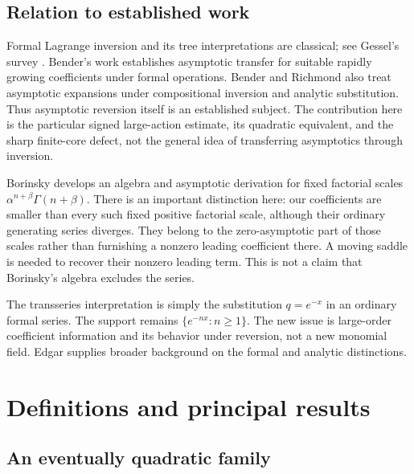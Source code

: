 \documentclass[11pt,a4paper]{article}
\numberwithin{equation}{section}
\theoremstyle{definition}
\theoremstyle{remark}
\begin{document}
\subsection{Relation to established work}

Formal Lagrange inversion and its tree interpretations are classical; see
Gessel's survey \cite{gessel}. Bender's work \cite{bender} establishes
asymptotic transfer for suitable rapidly growing coefficients under formal
operations. Bender and Richmond \cite{bender-richmond} also treat asymptotic
expansions under compositional inversion and analytic substitution. Thus
asymptotic reversion itself is an established subject. The contribution here
is the particular signed large-action estimate, its quadratic equivalent,
and the sharp finite-core defect, not the general idea of transferring
asymptotics through inversion.

Borinsky \cite{borinsky} develops an algebra and asymptotic derivation for
fixed factorial scales $\alpha^{n+\beta}\Gamma(n+\beta)$. There is an
important distinction here: our coefficients are smaller than every such
fixed positive factorial scale, although their ordinary generating series
diverges. They belong to the zero-asymptotic part of those scales rather
than furnishing a nonzero leading coefficient there. A moving saddle is
needed to recover their nonzero leading term. This is not a claim that
Borinsky's algebra excludes the series.

The transseries interpretation is simply the substitution $q=e^{-x}$ in
an ordinary formal series. The support remains $\{e^{-nx}:n\ge1\}$.
The new issue is large-order coefficient information and its behavior under
reversion, not a new monomial field. Edgar \cite{edgar} supplies broader
background on the formal and analytic distinctions.

\section{Definitions and principal results}
\label{sec:main}

\subsection{An eventually quadratic family}
\end{document}

